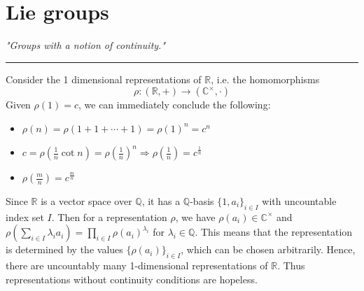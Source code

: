 \chapter{Lie groups}

\begin{center}
    \vspace{-15pt}
    {\large\itshape "Groups with a notion of continuity."\par}
    \vspace{-8pt}
    {\color{gray!70}\rule{0.32\textwidth}{0.5pt}\par}
\end{center}



Consider the 1 dimensional representations of $\mathbb{R}$, i.e. the homomorphisms 
\[\rho:(\mathbb{R},+)\to(\mathbb{C}^\times,\cdot)\]
Given $\rho(1) = c$, we can immediately conclude the following:
\begin{itemize}
    \item $\rho(n) = \rho(1+1+\cdots+1) = \rho(1)^n = c^n$
    \item $c = \rho(\frac1n \cot n) = \rho(\frac1n)^n \Rightarrow \rho(\frac1n) = c^{\frac1n}$
    \item $\rho(\frac{m}{n}) = c^{\frac{m}{n}}$
\end{itemize}

Since $\mathbb{R}$ is a vector space over $\mathbb{Q}$, it has a $\mathbb{Q}$-basis $\{1,a_i\}_{i\in I}$ with uncountable index set $I$. Then for a representation $\rho$, we have $\rho(a_i) \in \mathbb{C}^\times$ and $\rho\left(\sum_{i \in I} \lambda_i a_i\right) = \prod_{i \in I} \rho(a_i)^{\lambda_i}$ for $\lambda_i \in \mathbb{Q}$. This means that the representation is determined by the values $\{\rho(a_i)\}_{i\in I}$, which can be chosen arbitrarily. Hence, there are uncountably many 1-dimensional representations of $\mathbb{R}$. Thus representations without continuity conditions are hopeless.


